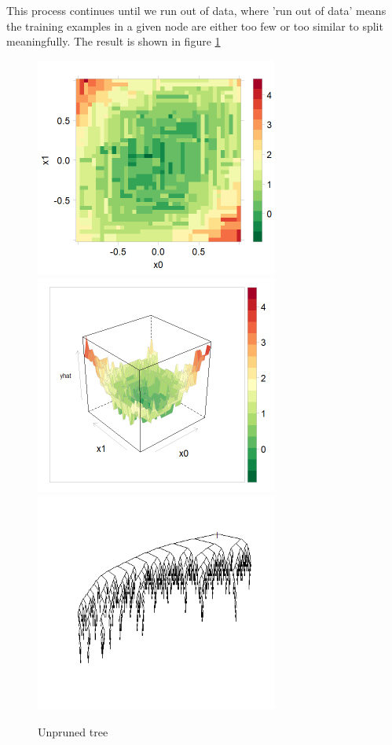 \documentclass[10pt,openany]{article}
\numberwithin{definition}{section}
\numberwithin{example}{section}
\numberwithin{equation}{section}
\numberwithin{figure}{section}
\begin{document}
This process continues until we run out of data, where 'run out of
data' means the training examples in a given node are either too few
or too similar to split meaningfully. The result is shown in figure
\ref{fig:unpruned-tree}

\begin{figure}
\noindent \begin{centering}
\includegraphics[width=80mm]{../fig/rpart-unpruned-levelplot}~
\includegraphics[width=80mm]{../fig/rpart-unpruned-wireframe}~
\includegraphics[width=80mm]{../fig/rpart-unpruned-tree}
\par\end{centering}

\protect\caption{\label{fig:unpruned-tree}Unpruned tree}
\end{figure}
\end{document}
